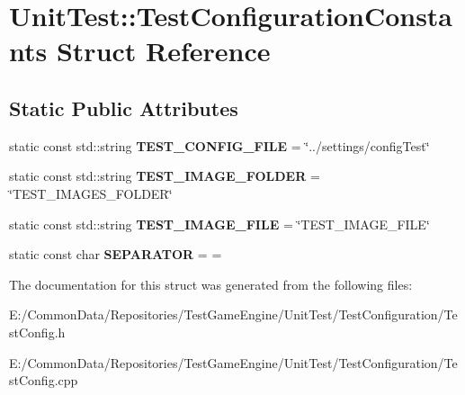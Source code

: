 \hypertarget{struct_unit_test_1_1_test_configuration_constants}{}\section{Unit\+Test\+::Test\+Configuration\+Constants Struct Reference}
\label{struct_unit_test_1_1_test_configuration_constants}
\subsection*{Static Public Attributes}
\begin{DoxyCompactItemize}
\item 
\mbox{\label{struct_unit_test_1_1_test_configuration_constants_ae33a2e2c70d34ce6a0871efd0475189b}} 
static const std\+::string {\bfseries T\+E\+S\+T\+\_\+\+C\+O\+N\+F\+I\+G\+\_\+\+F\+I\+LE} = \char`\"{}../settings/config\+Test\char`\"{}
\item 
\mbox{\label{struct_unit_test_1_1_test_configuration_constants_a44f27b246f1857daa5dfa9090f50d546}} 
static const std\+::string {\bfseries T\+E\+S\+T\+\_\+\+I\+M\+A\+G\+E\+\_\+\+F\+O\+L\+D\+ER} = \char`\"{}T\+E\+S\+T\+\_\+\+I\+M\+A\+G\+E\+S\+\_\+\+F\+O\+L\+D\+ER\char`\"{}
\item 
\mbox{\label{struct_unit_test_1_1_test_configuration_constants_a7e0716068872d0c1d02c6fe6154f1c0f}} 
static const std\+::string {\bfseries T\+E\+S\+T\+\_\+\+I\+M\+A\+G\+E\+\_\+\+F\+I\+LE} = \char`\"{}T\+E\+S\+T\+\_\+\+I\+M\+A\+G\+E\+\_\+\+F\+I\+LE\char`\"{}
\item 
\mbox{\label{struct_unit_test_1_1_test_configuration_constants_a9d8640cfff9fdbb13a93a758f3217a45}} 
static const char {\bfseries S\+E\+P\+A\+R\+A\+T\+OR} = \textquotesingle{}=\textquotesingle{}
\end{DoxyCompactItemize}


The documentation for this struct was generated from the following files\+:\begin{DoxyCompactItemize}
\item 
E\+:/\+Common\+Data/\+Repositories/\+Test\+Game\+Engine/\+Unit\+Test/\+Test\+Configuration/Test\+Config.\+h\item 
E\+:/\+Common\+Data/\+Repositories/\+Test\+Game\+Engine/\+Unit\+Test/\+Test\+Configuration/Test\+Config.\+cpp\end{DoxyCompactItemize}
